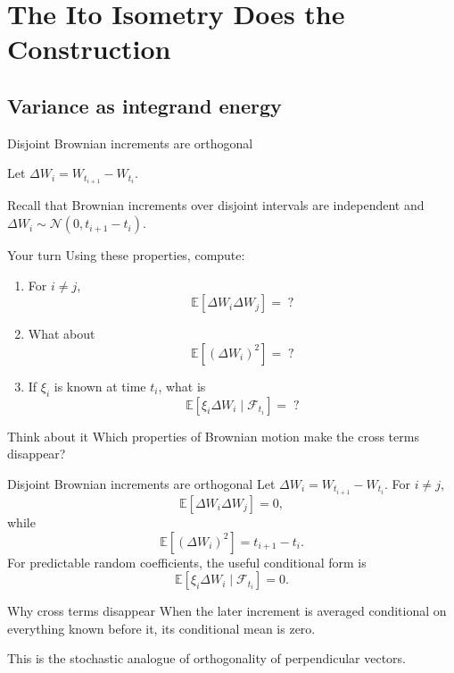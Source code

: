 \documentclass[handout,10pt,aspectratio=169]{beamer}
\newcommand{\E}{\mathbb E}
\newcommand{\F}{\mathcal F}
\begin{document}
\section{The Ito Isometry Does the Construction}
\subsection{Variance as integrand energy}

\begin{frame}[shrink=5]{Disjoint Brownian increments are orthogonal}

Let
$
\Delta W_i = W_{t_{i+1}}-W_{t_i}.
$

Recall that Brownian increments over disjoint intervals are independent and
$
\Delta W_i \sim \mathcal N(0,t_{i+1}-t_i).
$

\begin{block}{Your turn}
Using these properties, compute:

\begin{enumerate}
    \item For \(i\neq j\),
    \[
    \E[\Delta W_i \Delta W_j] = \; ?
    \]

    \item What about
    \[
    \E[(\Delta W_i)^2] = \; ?
    \]

    \item If \(\xi_i\) is known at time \(t_i\), what is
    \[
    \E[\xi_i\Delta W_i\mid\F_{t_i}] = \; ?
    \]
\end{enumerate}
\end{block}

\begin{block}{Think about it}
Which properties of Brownian motion make the cross terms disappear?
\end{block}

\end{frame}

\begin{frame}{Disjoint Brownian increments are orthogonal}
Let \(\Delta W_i=W_{t_{i+1}}-W_{t_i}\). For \(i\neq j\),
\[
\E[\Delta W_i\Delta W_j]=0,
\]
while
\[
\E[(\Delta W_i)^2]=t_{i+1}-t_i.
\]
For predictable random coefficients, the useful conditional form is
\[
\E[\xi_i\Delta W_i\mid\F_{t_i}]=0.
\]
\begin{block}{Why cross terms disappear}
When the later increment is averaged conditional on everything known before it, its conditional mean is zero.
\end{block}
This is the stochastic analogue of orthogonality of perpendicular vectors.
\end{frame}
\end{document}
